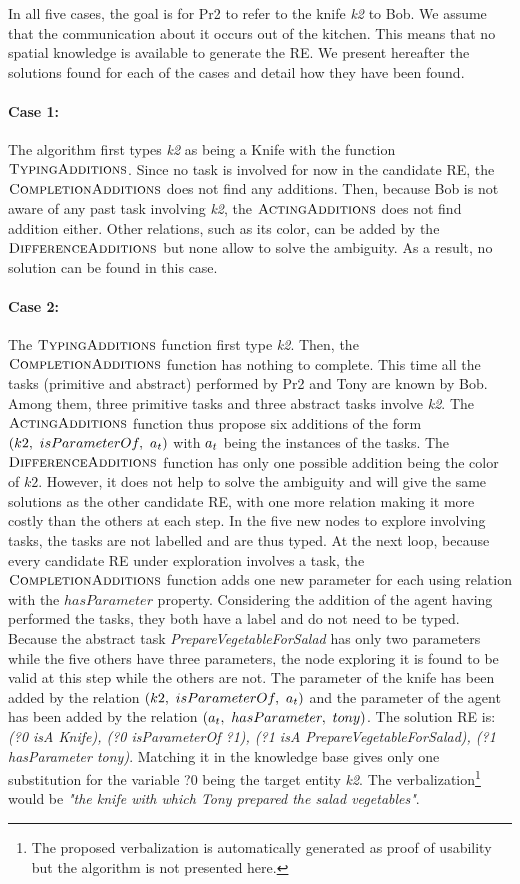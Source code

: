 In all five cases, the goal is for Pr2 to refer to the knife \textit{k2} to Bob. We assume that the communication about it occurs out of the kitchen. This means that no spatial knowledge is available to generate the RE. We present hereafter the solutions found for each of the cases and detail how they have been found.

\paragraph{Case 1:} The algorithm first types \textit{k2} as being a Knife with the function $\textsc{TypingAdditions}$.
Since no task is involved for now in the candidate RE, the $\textsc{CompletionAdditions}$ does not find any additions. Then, because Bob is not aware of any past task involving \textit{k2}, the $\textsc{ActingAdditions}$ does not find addition either. Other relations, such as its color, can be added by the $\textsc{DifferenceAdditions}$ but none allow to solve the ambiguity. As a result, no solution can be found in this case.

\paragraph{Case 2:} The $\textsc{TypingAdditions}$ function first type \textit{k2}. Then, the $\textsc{CompletionAdditions}$ function has nothing to complete. This time all the tasks (primitive and abstract) performed by Pr2 and Tony are known by Bob. Among them, three primitive tasks and three abstract tasks involve \textit{k2}. The $\textsc{ActingAdditions}$ function thus propose six additions of the form $(k2,\ isParameterOf,\ \indiv_t)$ with $a_t$ being the instances of the tasks. The $\textsc{DifferenceAdditions}$ function has only one possible addition being the color of $k2$. However, it does not help to solve the ambiguity and will give the same solutions as the other candidate RE, with one more relation making it more costly than the others at each step. In the five new nodes to explore involving tasks, the tasks are not labelled and are thus typed. At the next loop, because every candidate RE under exploration involves a task, the $\textsc{CompletionAdditions}$ function adds one new parameter for each using relation with the $hasParameter$ property. Considering the addition of the agent having performed the tasks, they both have a label and do not need to be typed. Because the abstract task \textit{PrepareVegetableForSalad} has only two parameters while the five others have three parameters, the node exploring it is found to be valid at this step while the others are not. The parameter of the knife has been added by the relation $(k2,\ isParameterOf,\ \indiv_t)$ and the parameter of the agent has been added by the relation $(a_t,\ hasParameter,\ tony)$. The solution RE is: \textit{(?0 isA Knife), (?0 isParameterOf ?1), (?1 isA PrepareVegetableForSalad), (?1 hasParameter tony)}. Matching it in the knowledge base gives only one substitution for the variable ?0 being the target entity \textit{k2}. The verbalization\footnote{The proposed verbalization is automatically generated as proof of usability but the algorithm is not presented here.} would be \textit{"the knife with which Tony prepared the salad vegetables"}.

